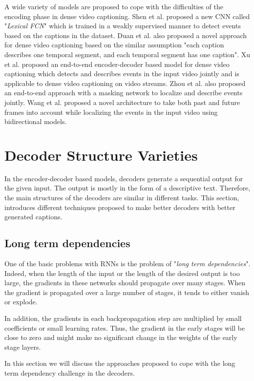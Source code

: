 \documentclass[preprint, 10pt]{elsarticle}
\begin{document}
		A wide variety of models are proposed to cope with the difficulties of the encoding phase in dense video captioning. Shen et al. \cite{shen2017weakly} proposed a new CNN called "\textit{Lexical FCN}" which is trained in a weakly supervised manner to detect events based on the captions in the dataset. Duan et al. also proposed a novel approach for dense video captioning based on the similar assumption "each caption describes one temporal segment, and each temporal segment has one caption"\cite{duan2018weakly}. Xu et al. proposed an end-to-end encoder-decoder based model for dense video captioning which detects and describes events in the input video jointly and is applicable to dense video captioning on video streams. Zhou et al. also proposed an end-to-end approach with a masking network to localize and describe events jointly\cite{zhou2018end}. Wang et al. proposed a novel architecture to take both past and future frames into account while localizing the events in the input video \cite{wang2018bidirectional} using bidirectional models. 
	
	\section{Decoder Structure Varieties}
	In the encoder-decoder based models, decoders generate a sequential output for the given input. The output is mostly in the form of a descriptive text. Therefore, the main structures of the decoders are similar in different tasks. This section, introduces different techniques proposed to make better decoders with better generated captions. 
		\subsection{Long term dependencies}
		One of the basic problems with RNNs is the problem of "\textit{long term dependencies}". Indeed, when the length of the input or the length of the desired output is too large, the gradients in these networks  should propagate over many stages. When the gradient is propagated over a large number of stages, it tends to either vanish or explode.
		
		 In addition, the gradients in each backpropagation step are multiplied by small coefficients or small learning rates. Thus, the gradient in the early stages will be close to zero and might make no significant change in the weights of the early stage layers\cite{goodfellow2016deep}. 
		
		In this section we will discuss the approaches proposed to cope with the long term dependency challenge in the decoders.
		
\end{document}
